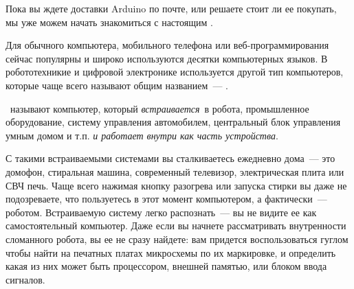 \secdown

Пока вы ждете доставки Arduino по почте, или решаете стоит ли ее покупать, мы
уже можем начать знакомиться с настоящим . 

\label{embed}\secdown

Для обычного компьютера, мобильного телефона или веб-программирования сейчас
популярны и широко используются десятки компьютерных языков. В робототехникие и
цифровой электронике используется другой тип компьютеров, которые чаще всего
называют общим названием\ --- .

\begin{framed}
\noindent{}\ называют компьютер, который \emph{встраивается}\ в робота,
промышленное оборудование, систему управления автомобилем, центральный блок
управления умным домом и т.п. \emph{и работает внутри как часть устройства}.
\end{framed}

С такими встраиваемыми системами вы сталкиваетесь ежедневно дома\ --- это
домофон, стиральная машина, современный телевизор, электрическая плита или СВЧ
печь. Чаще всего нажимая кнопку разогрева или запуска стирки вы даже не
подозреваете, что пользуетесь в этот момент компьютером, а фактически\ ---
роботом.
Встраиваемую систему легко распознать\ --- вы не видите ее как самостоятельный
компьютер. Даже если вы начнете рассматривать внутренности сломанного робота, вы
ее не сразу найдете: вам придется воспользоваться гуглом чтобы найти на печатных
платах микросхемы по их маркировке, и определить какая из них может быть
процессором, внешней памятью, или блоком ввода сигналов.


